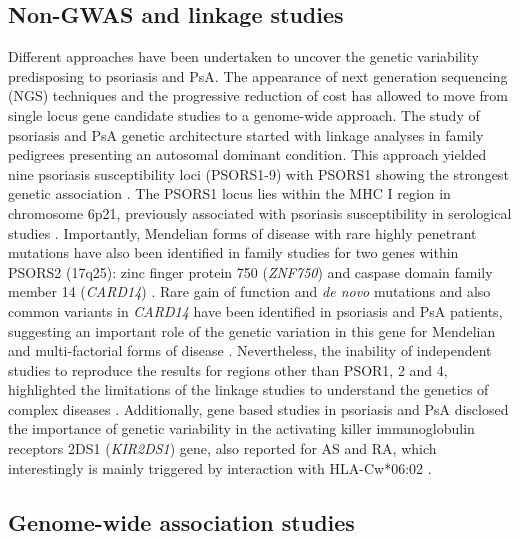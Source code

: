 \subsection{Non-GWAS and linkage studies}
Different approaches have been undertaken to uncover the genetic variability predisposing to psoriasis and PsA. The appearance of next generation sequencing (NGS) techniques and the progressive reduction of cost has allowed to move from single locus gene candidate studies to a genome-wide approach.
The study of psoriasis and PsA genetic architecture started with linkage analyses in family pedigrees presenting an autosomal dominant condition. This approach yielded nine psoriasis susceptibility loci (PSORS1-9) with PSORS1 showing the strongest genetic association \parencite{Capon2017, International2003}. The PSORS1 locus lies within the MHC I region in chromosome 6p21, previously associated with psoriasis susceptibility in serological studies \parencite{Rusell1972, Tiilikainen1980}. Importantly, Mendelian forms of disease with rare highly penetrant mutations have also been identified in family studies for two genes within PSORS2 (17q25): zinc finger protein 750 (\textit{ZNF750}) and caspase domain family member 14 (\textit{CARD14}) \parencite{Tomfohrde1994,Jordan2012}. Rare gain of function and \textit{de novo} mutations and also common variants in \textit{CARD14} have been identified in psoriasis and PsA patients, suggesting an important role of the genetic variation in this gene for Mendelian and multi-factorial forms of disease \parencite {Jordan2012, Tsoi2012}. %
Nevertheless, the inability of independent studies to reproduce the results for regions other than PSOR1, 2 and 4, highlighted the limitations of the linkage studies to understand the genetics of complex diseases \parencite{Capon2017}. Additionally, gene based studies in psoriasis and PsA disclosed the importance of genetic variability in the activating killer immunoglobulin receptors 2DS1 (\textit{KIR2DS1}) gene, also reported for AS and RA, which interestingly is mainly triggered by interaction with HLA-Cw*06:02 \parencite{Łuszczek2004, Williams2005,Carter2007, Yen2001}.  


\subsection{Genome-wide association studies}


